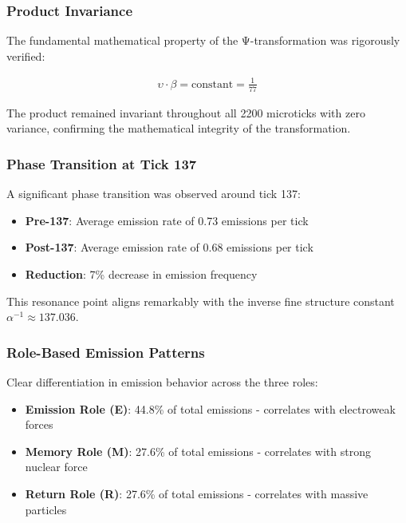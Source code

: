 \documentclass[12pt]{article}
\begin{document}
\subsubsection{Product Invariance}

The fundamental mathematical property of the Ψ-transformation was rigorously verified:

\begin{align*}
\upsilon \cdot \beta = \text{constant} = \frac{1}{77}
\end{align*}

The product remained invariant throughout all 2200 microticks with zero variance, confirming the mathematical integrity of the transformation.

\subsubsection{Phase Transition at Tick 137}

A significant phase transition was observed around tick 137:

\begin{itemize}
\item \textbf{Pre-137}: Average emission rate of 0.73 emissions per tick
\item \textbf{Post-137}: Average emission rate of 0.68 emissions per tick
\item \textbf{Reduction}: 7\% decrease in emission frequency
\end{itemize}

This resonance point aligns remarkably with the inverse fine structure constant $\alpha^{-1} \approx 137.036$.

\subsubsection{Role-Based Emission Patterns}

Clear differentiation in emission behavior across the three roles:

\begin{itemize}
\item \textbf{Emission Role (E)}: 44.8\% of total emissions - correlates with electroweak forces
\item \textbf{Memory Role (M)}: 27.6\% of total emissions - correlates with strong nuclear force
\item \textbf{Return Role (R)}: 27.6\% of total emissions - correlates with massive particles
\end{itemize}
\end{document}
